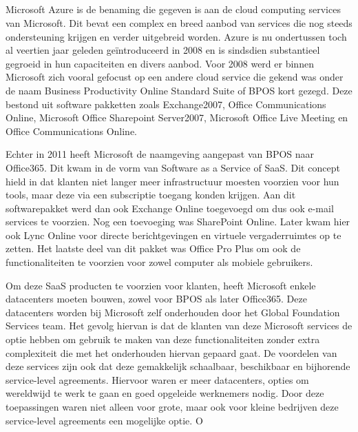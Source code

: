 \subsection{}%
\label{sec:Microsoft Azure}

Microsoft Azure is de benaming die gegeven is aan de cloud computing services van Microsoft. Dit bevat een complex en breed aanbod van services die nog steeds ondersteuning krijgen en verder uitgebreid worden. Azure is nu ondertussen toch al veertien jaar geleden geïntroduceerd in 2008 en is sindsdien substantieel gegroeid in hun capaciteiten en divers aanbod. Voor 2008 werd er binnen Microsoft zich vooral gefocust op een andere cloud service die gekend was onder de naam Business Productivity Online Standard Suite of BPOS kort gezegd. Deze bestond uit software pakketten zoals Exchange2007, Office Communications Online, Microsoft Office Sharepoint Server2007, Microsoft Office Live Meeting en Office Communications Online.

Echter in 2011 heeft Microsoft de naamgeving aangepast van BPOS naar Office365. Dit kwam in de vorm van Software as a Service of SaaS. Dit concept hield in dat klanten niet langer meer infrastructuur moesten voorzien voor hun tools, maar deze via een subscriptie toegang konden krijgen. Aan dit softwarepakket werd dan ook Exchange Online toegevoegd om dus ook e-mail services te voorzien. Nog een toevoeging was SharePoint Online. Later kwam hier ook Lync Online voor directe berichtgevingen en virtuele vergaderruimtes op te zetten. Het laatste deel van dit pakket was Office Pro Plus om ook de functionaliteiten te voorzien voor zowel computer als mobiele gebruikers.

Om deze SaaS producten te voorzien voor klanten, heeft Microsoft enkele datacenters moeten bouwen, zowel voor BPOS als later Office365. Deze datacenters worden bij Microsoft zelf onderhouden door het Global Foundation Services team. Het gevolg hiervan is dat de klanten van deze Microsoft services de optie hebben om gebruik te maken van deze functionaliteiten zonder extra complexiteit die met het onderhouden hiervan gepaard gaat. De voordelen van deze services zijn ook dat deze gemakkelijk schaalbaar, beschikbaar en bijhorende service-level agreements. Hiervoor waren er meer datacenters, opties om wereldwijd te werk te gaan en goed opgeleide werknemers nodig. Door deze toepassingen waren niet alleen voor grote, maar ook voor kleine bedrijven deze service-level agreements een mogelijke optie. O

